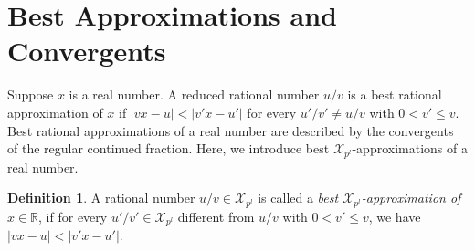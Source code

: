 \documentclass[12pt]{elsarticle}
\theoremstyle{definition}
\newtheorem{defi}{Definition}
\newcommand{\field}[1]{\mathbb{#1}}          \newcommand{\Q}{\field{Q}}
\newcommand{\R}{\field{R}}                   \newcommand{\Z}{\field{Z}}
\newcommand{\mX}{{\mathcal X}}
\begin{document}
{%
  	
   	
  	\section{Best Approximations and Convergents}
  	Suppose $x$ is a real number. A reduced rational number $u/v$ is a best rational approximation of $x$ if $|vx-u|<|v'x-u'|$ for every $u'/v'\ne u/v$ with $0<v'\le v.$ %
  	 Best rational approximations of a real number are described by the convergents of the regular continued fraction. Here, we introduce best  $\mX_{p^l}$-approximations  of a real number.
  
  	\begin{defi}
  		A rational number $u/v\in \mX_{p^l}$ is called a {\it best $\mX_{p^l}$-approximation of $x\in\R$}, if for every $u'/v'\in\mX_{p^l}$ different from $u/v$ with
  		$0< v' \le v$, we have $|vx-u|<|v'x-u'|$.
  	\end{defi}
  	
}
\end{document}
